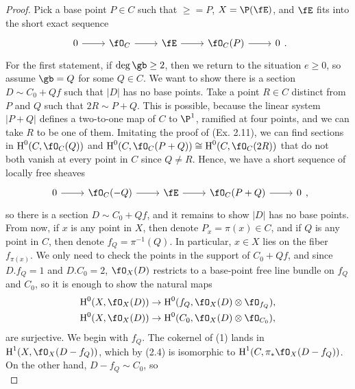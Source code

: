 \documentclass[a4paper]{article}
\begin{document}
\begin{enumerate} [label=\textbf{\arabic*.}, leftmargin=0em]
\begin{proof}
               Pick a base point $P \in C$ such that $\ge = P$, $X = \P(\fE)$, and $\fE$ fits into the short exact sequence
              \[ \begin{tikzcd}
                      0 \arrow[r] & \fO_C \arrow[r] & \fE \arrow[r] & \fO_C(P) \arrow[r] & 0
                  \end{tikzcd} . \]
              For the first statement, if $\deg \gb \geq 2$, then we return to the situation $e \geq 0$, so assume $\gb = Q$ for some $Q \in C$.
              We want to show there is a section $D \sim C_0 + Qf$ such that $|D|$ has no base points.
              Take a point $R \in C$ distinct from $P$ and $Q$ such that $2R \sim P + Q$.
              This is possible, because the linear system $|P + Q|$ defines a two-to-one map of $C$ to $\P^1$, ramified at four points, and we can take $R$ to be one of them.
              Imitating the proof of (Ex. 2.11), we can find sections in $\cH^0(C, \fO_C(Q))$ and $\cH^0(C, \fO_C(P + Q)) \cong \cH^0(C, \fO_C(2R))$ that do not both vanish at every point in $C$ since $Q \neq R$.
              Hence, we have a short sequence of locally free sheaves
              \[ \begin{tikzcd}
                      0 \arrow[r] & \fO_C(-Q) \arrow[r] & \fE \arrow[r] & \fO_C(P + Q) \arrow[r] & 0
                  \end{tikzcd} , \]
              so there is a section $D \sim C_0 + Q f$, and it remains to show $|D|$ has no base points.
              From now, if $x$ is any point in $X$, then denote $P_x = \pi(x) \in C$, and if $Q$ is any point in $C$, then denote $f_Q = \pi^{-1}(Q)$.
              In particular, $x \in X$ lies on the fiber $f_{\pi(x)}$.
              We only need to check the points in the support of $C_0 + Qf$, and since $D.f_Q = 1$ and $D.C_0 = 2$, $\fO_X(D)$ restricts to a base-point free line bundle on $f_Q$ and $C_0$, so it is enough to show the natural maps
              \begin{align}
                  \cH^0(X, \fO_X(D)) & \to \cH^0(f_Q, \fO_X(D) \otimes \fO_{f_Q}), \\
                  \cH^0(X, \fO_X(D)) & \to \cH^0(C_0, \fO_X(D) \otimes \fO_{C_0}),
              \end{align}
              are surjective.
              We begin with $f_Q$.
              The cokernel of (1) lands in $\cH^1(X, \fO_X(D - f_Q))$, which by (2.4) is isomorphic to $\cH^1(C, \pi_*\fO_X(D - f_Q))$.
              On the other hand, $D - f_Q \sim C_0$, so
              \begin{equation*}

\end{equation*}
\end{proof}
\end{enumerate}
\end{document}
